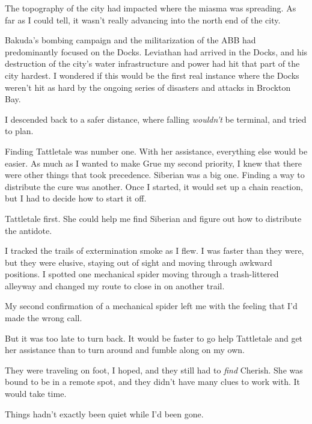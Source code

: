 The topography of the city had impacted where the miasma was spreading.  As far as I could tell, it wasn't really advancing into the north end of the city.



Bakuda's bombing campaign and the militarization of the ABB had predominantly focused on the Docks.  Leviathan had arrived in the Docks, and his destruction of the city's water infrastructure and power had hit that part of the city hardest.  I wondered if this would be the first real instance where the Docks weren't hit as hard by the ongoing series of disasters and attacks in Brockton Bay.



I descended back to a safer distance, where falling \emph{wouldn't} be terminal, and tried to plan.



Finding Tattletale was number one.  With her assistance, everything else would be easier.  As much as I wanted to make Grue my second priority, I knew that there were other things that took precedence.  Siberian was a big one.  Finding a way to distribute the cure was another.  Once I started, it would set up a chain reaction, but I had to decide how to start it off.



Tattletale first.  She could help me find Siberian and figure out how to distribute the antidote.



I tracked the trails of extermination smoke as I flew.  I was faster than they were, but they were elusive, staying out of sight and moving through awkward positions.  I spotted one mechanical spider moving through a trash-littered alleyway and changed my route to close in on another trail.



My second confirmation of a mechanical spider left me with the feeling that I'd made the wrong call.



But it was too late to turn back.  It would be faster to go help Tattletale and get her assistance than to turn around and fumble along on my own.



They were traveling on foot, I hoped, and they still had to \emph{find }Cherish.  She was bound to be in a remote spot, and they didn't have many clues to work with.  It would take time.



Things hadn't exactly been quiet while I'd been gone.



